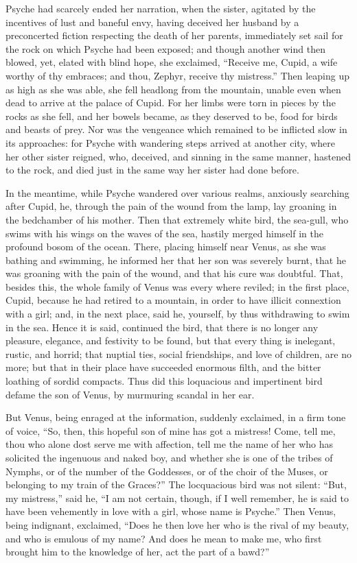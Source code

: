 \documentclass[12pt]{article}
\begin{document}
Psyche had scarcely ended her narration, when the sister, agitated by the
incentives of lust and baneful envy, having deceived her husband by a
preconcerted fiction respecting the death of her parents, immediately set sail
for the rock on which Psyche had been exposed; and though another wind then
blowed, yet, elated with blind hope, she exclaimed, ``Receive me, Cupid, a wife
worthy of thy embraces; and thou, Zephyr, receive thy mistress.'' Then leaping
up as high as she was able, she fell headlong from the mountain, unable even
when dead to arrive at the palace of Cupid. For her limbs were torn in pieces
by the rocks as she fell, and her bowels became, as they deserved to be, food
for birds and beasts of prey. Nor was the vengeance which remained to be
inflicted slow in its approaches: for Psyche with wandering steps arrived at
another city, where her other sister reigned, who, deceived, and sinning in the
same manner, hastened to the rock, and died just in the same way her sister had
done before.

In the meantime, while Psyche wandered over various realms, anxiously searching
after Cupid, he, through the pain of the wound from the lamp, lay groaning in
the bedchamber of his mother. Then that extremely white bird, the sea-gull, who
swims with his wings on the waves of the sea, hastily merged himself in the
profound bosom of the ocean. There, placing himself near Venus, as she was
bathing and swimming, he informed her that her son was severely burnt, that he
was groaning with the pain of the wound, and that his cure was doubtful. That,
besides this, the whole family of Venus was every where reviled; in the first
place, Cupid, because he had retired to a mountain, in order to have illicit
connextion with a girl; and, in the next place, said he, yourself, by thus
withdrawing to swim in the sea. Hence it is said, continued the bird, that
there is no longer any pleasure, elegance, and festivity to be found, but that
every thing is inelegant, rustic, and horrid; that nuptial ties, social
friendships, and love of children, are no more; but that in their place have
succeeded enormous filth, and the bitter loathing of sordid compacts. Thus did
this loquacious and impertinent bird defame the son of Venus, by murmuring
scandal in her ear.

But Venus, being enraged at the information, suddenly exclaimed, in a firm tone
of voice, ``So, then, this hopeful son of mine has got a mistress! Come, tell
me, thou who alone dost serve me with affection, tell me the name of her who
has solicited the ingenuous and naked boy, and whether she is one of the tribes
of Nymphs, or of the number of the Goddesses, or of the choir of the Muses, or
belonging to my train of the Graces?'' The locquacious bird was not silent:
``But, my mistress,'' said he, ``I am not certain, though, if I well remember,
he is said to have been vehemently in love with a girl, whose name is Psyche.''
Then Venus, being indignant, exclaimed, ``Does he then love her who is the
rival of my beauty, and who is emulous of my name? And does he mean to make me,
who first brought him to the knowledge of her, act the part of a bawd?''
\end{document}
